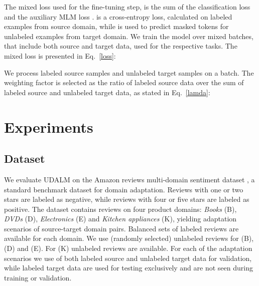 \documentclass[11pt]{article}
\begin{document}
The mixed loss used for the fine-tuning step, is the sum of the classification loss  and the auxiliary MLM loss . 
 is a cross-entropy loss, calculated on labeled examples from source domain, while  is used to predict masked tokens for unlabeled examples from target domain.
We train the model over mixed batches, that include both source and target data, used for the respective tasks. 
The mixed loss is presented in Eq.~\ref{loss}:

We process  labeled source samples  and  unlabeled target samples  on a batch. The weighting factor   is selected as the ratio of labeled source data over the sum of labeled source and unlabeled target data, as stated in Eq.~\ref{lamda}:


\section{Experiments}
\subsection{Dataset}

We evaluate UDALM on the Amazon reviews multi-domain sentiment dataset \citep{blitzer-etal-2007-biographies}, a standard benchmark dataset for domain adaptation. Reviews with one or two stars are labeled as negative, while reviews with four or five stars are labeled as positive. 
The dataset contains reviews on four product domains: \textit{Books} (B), \textit{DVDs} (D), \textit{Electronics} (E) and \textit{Kitchen appliances} (K), yielding  adaptation scenarios of source-target domain pairs. 
Balanced sets of  labeled reviews are available for each domain.
We use  (randomly selected) unlabeled reviews for (B), (D) and (E). For (K)  unlabeled reviews are available.
For each of the  adaptation scenarios we use   of both labeled source and unlabeled target data for validation, while labeled target data are used for testing exclusively and are not seen during training or validation. 
\end{document}
